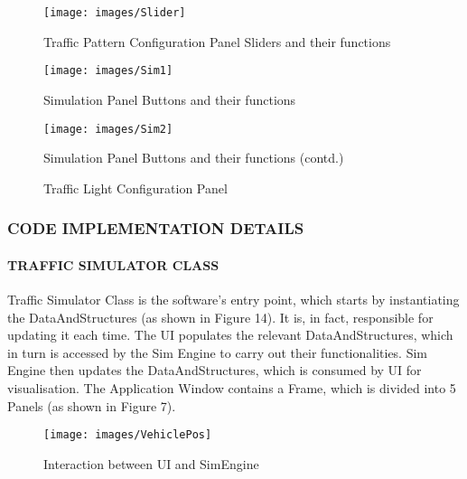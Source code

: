 \documentclass[11pt,a4paper]{article}
\begin{document}
	\begin{figure}[bp!]
		\texttt{[image: images/Slider]}
		\caption{Traffic Pattern Configuration Panel Sliders and their functions}
		\centering
	\end{figure}
	
	\begin{figure}[bp!]
		\texttt{[image: images/Sim1]}
		\caption{Simulation Panel Buttons and their functions}
		\centering
	\end{figure}
		
	\begin{figure}[h!]
		\texttt{[image: images/Sim2]}
		\caption{Simulation Panel Buttons and their functions (contd.)}
		\centering
	\end{figure}
	
	\begin{figure}[h!]
		\setlength\fboxsep{0pt}
		\setlength\fboxrule{0.5pt}
		\caption{Traffic Light Configuration Panel}
		\centering
	\end{figure}
 	
 \subsubsection{CODE IMPLEMENTATION DETAILS}	
 	\paragraph{TRAFFIC \textunderscore SIMULATOR CLASS}
	Traffic \textunderscore Simulator Class is the software’s entry
	point, which starts by instantiating the DataAndStructures (as
	shown in Figure 14). It is, in fact, responsible for updating it
	each time. The UI populates the relevant DataAndStructures, which in turn is
	accessed by the Sim Engine to carry out their functionalities. Sim
	Engine then updates the DataAndStructures, which is consumed by UI
	for visualisation. The Application Window contains a Frame, which is divided into 5
	Panels (as shown in Figure 7).
		
	\begin{figure}[h!]
		\texttt{[image: images/VehiclePos]}
		\caption{Interaction between UI and SimEngine}
		\centering
	\end{figure}
	
\end{document}
